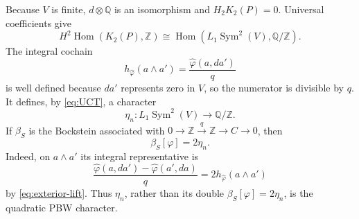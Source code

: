 \documentclass[11pt]{amsart}
\theoremstyle{remark}
\newcommand{\Z}{\mathbb Z}
\newcommand{\Q}{\mathbb Q}
\newcommand{\Sym}{\operatorname{Sym}}
\newcommand{\Hom}{\operatorname{Hom}}
\begin{document}
Because $V$ is finite, $d\otimes\Q$ is an isomorphism and
$H_2K_2(P)=0$.  Universal coefficients give
\begin{equation}\label{eq:UCT}
 H^2\Hom(K_2(P),\Z)
 \cong\Hom(L_1\Sym^2(V),\Q/\Z).
\end{equation}
The integral cochain
\[
 h_{\widehat\varphi}(a\wedge a')
 =\frac{\widehat\varphi(a,da')}{q}
\]
is well defined because $da'$ represents zero in $V$, so the numerator
is divisible by $q$.  It
defines, by \eqref{eq:UCT}, a character
\begin{equation}\label{eq:eta}
                         \eta_n:L_1\Sym^2(V)\to\Q/\Z.
\end{equation}
If $\beta_S$ is the Bockstein associated with
$0\to\Z\xrightarrow q\Z\to C\to0$, then
\begin{equation}\label{eq:half}
                         \beta_S[\varphi]=2\eta_n.
\end{equation}
Indeed, on $a\wedge a'$ its integral representative is
\[
 \frac{\widehat\varphi(a,da')-\widehat\varphi(a',da)}q
 =2h_{\widehat\varphi}(a\wedge a')
\]
by \eqref{eq:exterior-lift}.
Thus $\eta_n$, rather than its double
$\beta_S[\varphi]=2\eta_n$, is the quadratic PBW character.
\end{document}
